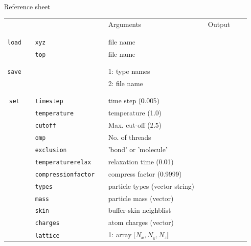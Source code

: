 \documentclass[11pt]{article}
\begin{document}
\appendix

\clearpage

\begin{center}

  {\huge{Reference sheet}}
  
  \bigskip

  \bigskip
  
  \begin{tabular}{cclclcccc}
    {\color{red}{\textbf{Action}}} && {\color{blue}{Specifier}} && Arguments && Output \\
                                   && && && \\
    \hline
                                   && && && \\
    \verb!load! && \verb!xyz! && file name && \\
    $\mbox{}$ && \verb!top! && file name && \\
                                   && && && \\
    \hline
    && && && \\
    \verb!save! &&  && 1: type names && \\
                &&  && 2: file name && \\
                                   && && && \\
    \hline
                                   && && && \\
    \verb!set! && \verb!timestep! && time step (0.005) && \\
    $\mbox{}$  && \verb!temperature! && temperature (1.0) && \\
    $\mbox{}$  && \verb!cutoff! && Max. cut-off (2.5) && \\
    $\mbox{}$  && \verb!omp! && No. of threads && \\
    $\mbox{}$ && \verb!exclusion! && 'bond' or 'molecule' && \\
    $\mbox{}$ && \verb!temperaturerelax! && relaxation time (0.01) && \\
    $\mbox{}$ && \verb!compressionfactor! && compress factor (0.9999) && \\
    $\mbox{}$ && \verb!types! && particle types (vector string) && \\
    $\mbox{}$ && \verb!mass! && particle mass (vector) && \\
    $\mbox{}$ && \verb!skin! && buffer-skin neighblist && \\
    $\mbox{}$ && \verb!charges! && atom charges (vector) && \\
    $\mbox{}$ && \verb!lattice! && 1: array [$N_x , N_y , N_z$] && \\

\end{tabular}
\end{center}
\end{document}
